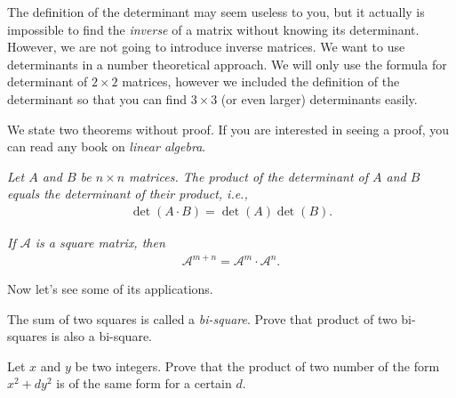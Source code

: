 \documentclass{subfile}
\begin{document}
The definition of the determinant may seem useless to you, but it actually is impossible to find the \textit{inverse} of a matrix without knowing its determinant. However, we are not going to introduce inverse matrices. We want to use determinants in a number theoretical approach. We will only use the formula for determinant of $2 \times 2$ matrices, however we included the definition of the determinant so that you can find $3 \times 3$ (or even larger) determinants easily.

We state two theorems without proof. If you are interested in seeing a proof, you can read any book on \textit{linear algebra}.

	\begin{theorem}\slshape
	Let $A$ and $B$ be $n\times n$ matrices. The product of the determinant of $A$ and $B$ equals the determinant of their product, i.e.,
	\begin{align*}
	\det(A \cdot B)=\det(A)\det(B).
	\end{align*}
	\end{theorem}
	

\begin{theorem}\slshape
If $\mathcal A$ is a square matrix, then 
\begin{align*}
\mathcal A^{m+n}=\mathcal A^m \cdot \mathcal{A}^n.
\end{align*}
\end{theorem}

Now let's see some of its applications.

\begin{problem}
The sum of two squares is called a \textit{bi-square}. Prove that product of two bi-squares is also a bi-square.
\end{problem}

\begin{problem}
Let $x$ and $y$ be two integers. Prove that the product of two number of the form $x^2+dy^2$ is of the same form for a  certain $d$. 
\end{problem}
\end{document}
